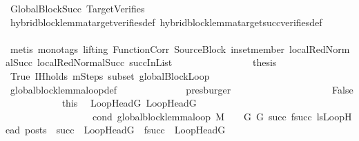 \begin{isabellebody}
\ GlobalBlockSucc\ TargetVerifies\isanewline
\ \ \ \ \ \ \ \ \ \ \ \ \isamarkupfalse%
\ hybrid{\isacharunderscore}{\kern0pt}block{\isacharunderscore}{\kern0pt}lemma{\isacharunderscore}{\kern0pt}target{\isacharunderscore}{\kern0pt}verifies{\isacharunderscore}{\kern0pt}def\ hybrid{\isacharunderscore}{\kern0pt}block{\isacharunderscore}{\kern0pt}lemma{\isacharunderscore}{\kern0pt}target{\isacharunderscore}{\kern0pt}succ{\isacharunderscore}{\kern0pt}verifies{\isacharunderscore}{\kern0pt}def\isanewline
\ \ \ \ \ \ \ \ \ \ \ \ \isamarkupfalse%
\ {\isacharparenleft}{\kern0pt}metis\ {\isacharparenleft}{\kern0pt}mono{\isacharunderscore}{\kern0pt}tags{\isacharcomma}{\kern0pt}\ lifting{\isacharparenright}{\kern0pt}\ FunctionCorr\ SourceBlock\ in{\isacharunderscore}{\kern0pt}set{\isacharunderscore}{\kern0pt}member\ local{\isachardot}{\kern0pt}RedNormalSucc{\isacharparenleft}{\kern0pt}{}{\isacharparenright}{\kern0pt}\ local{\isachardot}{\kern0pt}RedNormalSucc{\isacharparenleft}{\kern0pt}{}{\isacharparenright}{\kern0pt}\ succInList{\isacharparenright}{\kern0pt}\isanewline
\ \ \isanewline
\ \ \ \ \ \ \ \ \ \ \isamarkupfalse%
\ \isamarkupfalse%
\ {\isacharquery}{\kern0pt}thesis\isanewline
\ \ \ \ \ \ \ \ \ \ \ \ \isamarkupfalse%
\ True\ IH{\isacharunderscore}{\kern0pt}holds\ mSteps\ subset\ globalBlockLoop\isanewline
\ \ \ \ \ \ \ \ \ \ \ \ \isamarkupfalse%
\ global{\isacharunderscore}{\kern0pt}block{\isacharunderscore}{\kern0pt}lemma{\isacharunderscore}{\kern0pt}loop{\isacharunderscore}{\kern0pt}def\isanewline
\ \ \ \ \ \ \ \ \ \ \ \ \isamarkupfalse%
\ presburger\isanewline
\ \ \ \ \ \ \ \ \isamarkupfalse%
\isanewline
\ \ \ \ \ \ \ \ \ \ \isamarkupfalse%
\ False\isanewline
\ \ \ \ \ \ \ \ \ \ \isamarkupfalse%
\ this\ \isamarkupfalse%
\ LoopHeadG\ LoopHeadG{\isacharprime}{\kern0pt}\ \ \isanewline
\ \ \ \ \ \ \ \ \ \ \ \ \ \ \ \ \ \ cond{\isacharcolon}{\kern0pt}\ {\isachardoublequoteopen}global{\isacharunderscore}{\kern0pt}block{\isacharunderscore}{\kern0pt}lemma{\isacharunderscore}{\kern0pt}loop\ M\ {\isasymLambda}\ {\isasymGamma}\ {\isasymOmega}\ G\ G{\isacharprime}{\kern0pt}\ succ\ {\isacharparenleft}{\kern0pt}f{\isacharparenleft}{\kern0pt}succ{\isacharparenright}{\kern0pt}{\isacharparenright}{\kern0pt}\ lsLoopHead\ posts\ {\isasymor}\ {\isacharparenleft}{\kern0pt}succ\ {\isacharequal}{\kern0pt}\ LoopHeadG\ {\isasymand}\ f{\isacharparenleft}{\kern0pt}succ{\isacharparenright}{\kern0pt}\ {\isacharequal}{\kern0pt}\ LoopHeadG{\isacharprime}{\kern0pt}{\isacharparenright}{\kern0pt}{\isachardoublequoteclose}\ \isanewline

\end{isabellebody}
